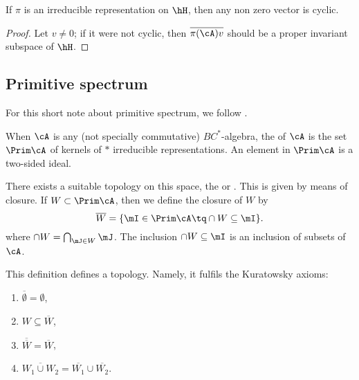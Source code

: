 \begin{lemma}
If $\pi$ is an irreducible representation on $\hH$, then any non zero vector is cyclic.
\end{lemma}

\begin{proof}
Let $v\neq 0$; if it were not cyclic, then $\overline{ \pi(\cA)v}$ should be a proper invariant  subspace of $\hH$.
\end{proof}

\subsection{Primitive spectrum}
For this short note about primitive spectrum, we follow \cite{Landi}.

When $\cA$ is any (not specially commutative) $BC^*$-algebra, the  of $\cA$ is the set $\Prim\cA$ of kernels of $*$ irreducible representations. An element in $\Prim\cA$ is a two-sided ideal.

There exists a suitable topology on this space, the  or . This is given by means of closure. If $W\subset\Prim\cA$, then we define the closure of $W$ by
\begin{equation}
  \overline{ W }=\{ \mI\in\Prim\cA\tq \cap W\subseteq \mI \}.
\end{equation}
where $\cap W=\bigcap_{\mJ\in W}\mJ$. The inclusion $\cap W\subseteq\mI$ is an inclusion of subsets of $\cA$.

\begin{proposition}
This definition defines a topology. Namely, it fulfils the Kuratowsky axioms:

\begin{enumerate}
\item\label{enu802i} $\overline{ \emptyset }=\emptyset$,
\item \label{enu802ii} $W\subseteq\overline{ W }$,
\item \label{enu802iii} $\overline{ \overline{ W } }=\overline{ W }$,
\item \label{enu802iv} $\overline{ W_1\cup W_2 }=\overline{ W_1 }\cup\overline{ W_2 }$.
\end{enumerate}
\end{proposition}


